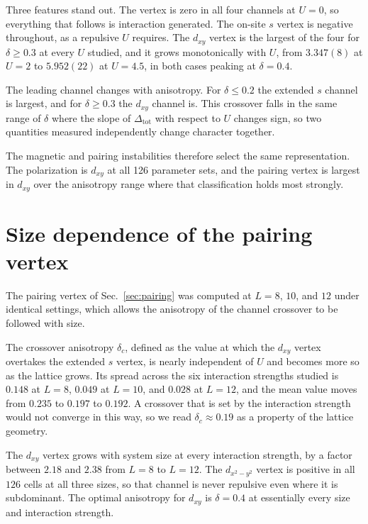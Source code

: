 \documentclass[aps,prb,reprint,superscriptaddress,amsmath,amssymb,floatfix]{revtex4-2}
\begin{document}
Three features stand out. The vertex is zero in all four channels at $U = 0$,
so everything that follows is interaction generated. The on-site $s$ vertex is
negative throughout, as a repulsive $U$ requires. The $d_{xy}$ vertex is the
largest of the four for $\delta \geq 0.3$ at every $U$ studied, and it grows
monotonically with $U$, from $3.347(8)$ at $U = 2$ to $5.952(22)$ at
$U = 4.5$, in both cases peaking at $\delta = 0.4$.

The leading channel changes with anisotropy. For $\delta \leq 0.2$ the extended
$s$ channel is largest, and for $\delta \geq 0.3$ the $d_{xy}$ channel is. This
crossover falls in the same range of $\delta$ where the slope of
$\Delta_{\mathrm{tot}}$ with respect to $U$ changes sign, so two quantities
measured independently change character together.

The magnetic and pairing instabilities therefore select the same
representation. The polarization is $d_{xy}$ at all 126 parameter sets, and the
pairing vertex is largest in $d_{xy}$ over the anisotropy range where that
classification holds most strongly.

\section{Size dependence of the pairing vertex}
\label{sec:vertexfss}

The pairing vertex of Sec.~\ref{sec:pairing} was computed at $L = 8$, $10$, and
$12$ under identical settings, which allows the anisotropy of the channel
crossover to be followed with size.

The crossover anisotropy $\delta_c$, defined as the value at which the $d_{xy}$
vertex overtakes the extended $s$ vertex, is nearly independent of $U$ and
becomes more so as the lattice grows. Its spread across the six interaction
strengths studied is $0.148$ at $L = 8$, $0.049$ at $L = 10$, and $0.028$ at
$L = 12$, and the mean value moves from $0.235$ to $0.197$ to $0.192$. A
crossover that is set by the interaction strength would not converge in this
way, so we read $\delta_c \approx 0.19$ as a property of the lattice geometry.

The $d_{xy}$ vertex grows with system size at every interaction strength, by a
factor between $2.18$ and $2.38$ from $L = 8$ to $L = 12$. The $d_{x^2-y^2}$
vertex is positive in all $126$ cells at all three sizes, so that channel is
never repulsive even where it is subdominant. The optimal anisotropy for
$d_{xy}$ is $\delta = 0.4$ at essentially every size and interaction strength.
\end{document}
